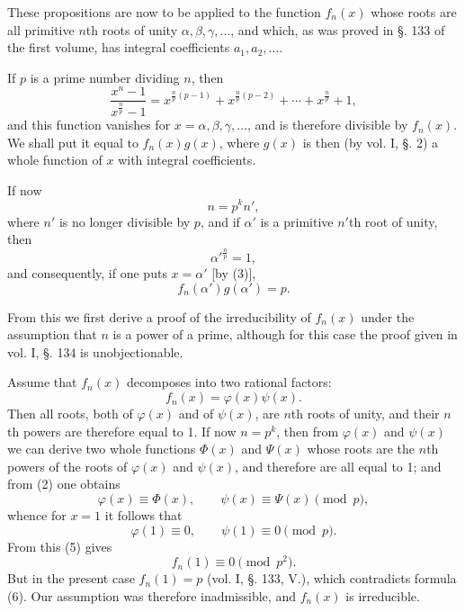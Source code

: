 \documentclass[11pt]{article}
\begin{document}
These propositions are now to be applied to the function $f_n(x)$ whose roots are all primitive $n$th roots of unity $\alpha,\beta,\gamma,\ldots$,
 and which, as was proved in §. 133 of the first volume, has integral coefficients $a_1,a_2,\ldots$.

If $p$ is a prime number dividing $n$, then
\begin{equation}\tag{3}
\frac{x^n-1}{x^{\frac np}-1}
=x^{\frac np(p-1)}+x^{\frac np(p-2)}+\cdots+x^{\frac np}+1,
\end{equation}
and this function vanishes for $x=\alpha,\beta,\gamma,\ldots$, and is therefore divisible by $f_n(x)$. We shall put it equal to $f_n(x)g(x)$, where $g(x)$ is then (by vol. I, §. 2) a whole function of $x$ with integral coefficients.

If now
\[
n=p^k n',
\]
where $n'$ is no longer divisible by $p$, and if $\alpha'$ is a primitive $n'$th root of unity, then
\[
\alpha'^{\frac np}=1,
\]
and consequently, if one puts $x=\alpha'$ [by (3)],
\begin{equation}\tag{4}
f_n(\alpha')g(\alpha')=p.
\end{equation}

From this we first derive a proof of the irreducibility of $f_n(x)$ under the assumption that $n$ is a power of a prime, although for this case the proof given in vol. I, §. 134 is unobjectionable.

Assume that $f_n(x)$ decomposes into two rational factors:
\begin{equation}\tag{5}
f_n(x)=\varphi(x)\psi(x).
\end{equation}
Then all roots, both of $\varphi(x)$ and of $\psi(x)$, are $n$th roots of unity, and their $n$th powers are therefore equal to 1. If now $n=p^k$, then from $\varphi(x)$ and $\psi(x)$ we can derive two whole functions $\Phi(x)$ and $\Psi(x)$ whose roots are the $n$th powers of the roots of $\varphi(x)$ and $\psi(x)$, and therefore are all equal to 1; and from (2) one obtains
\[
\varphi(x)\equiv\Phi(x),\qquad \psi(x)\equiv\Psi(x) \pmod p,
\]
whence for $x=1$ it follows that
\[
\varphi(1)\equiv0,
\qquad
\psi(1)\equiv0 \pmod p.
\]
From this (5) gives
\begin{equation}\tag{6}
f_n(1)\equiv0 \pmod {p^2}.
\end{equation}
But in the present case $f_n(1)=p$ (vol. I, §. 133, V.), which contradicts formula (6). Our assumption was therefore inadmissible, and $f_n(x)$ is irreducible.
\end{document}
